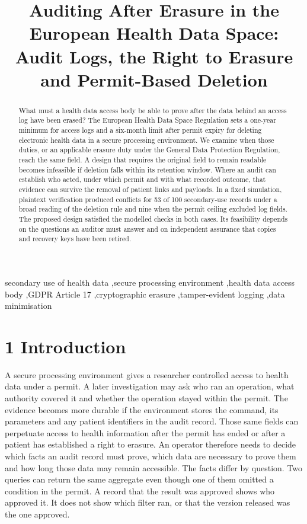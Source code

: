 \documentclass[preprint,review,12pt]{elsarticle}
\begin{document}
\begin{frontmatter}
\title{Auditing After Erasure in the European Health Data Space: Audit
Logs, the Right to Erasure and Permit-Based Deletion}
\begin{abstract}
What must a health data access body be able to prove after the data
behind an access log have been erased? The European Health Data Space
Regulation sets a one-year minimum for access logs and a six-month limit
after permit expiry for deleting electronic health data in a secure
processing environment. We examine when those duties, or an applicable
erasure duty under the General Data Protection Regulation, reach the
same field. A design that requires the original field to remain readable
becomes infeasible if deletion falls within its retention window. Where
an audit can establish who acted, under which permit and with what
recorded outcome, that evidence can survive the removal of patient links
and payloads. In a fixed simulation, plaintext verification produced
conflicts for 53 of 100 secondary-use records under a broad reading of
the deletion rule and nine when the permit ceiling excluded log fields.
The proposed design satisfied the modelled checks in both cases. Its
feasibility depends on the questions an auditor must answer and on
independent assurance that copies and recovery keys have been retired.
\end{abstract}
\begin{keyword}
secondary use of health data \sep secure processing
environment \sep health data access body \sep GDPR Article
17 \sep cryptographic erasure \sep tamper-evident logging \sep data
minimisation
\end{keyword}
\end{frontmatter}
\hypertarget{introduction}{%
\section{1 Introduction}\label{introduction}}

A secure processing environment gives a researcher controlled access to
health data under a permit. A later investigation may ask who ran an
operation, what authority covered it and whether the operation stayed
within the permit. The evidence becomes more durable if the environment
stores the command, its parameters and any patient identifiers in the
audit record. Those same fields can perpetuate access to health
information after the permit has ended or after a patient has
established a right to erasure. An operator therefore needs to decide
which facts an audit record must prove, which data are necessary to
prove them and how long those data may remain accessible. The facts
differ by question. Two queries can return the same aggregate even
though one of them omitted a condition in the permit. A record that the
result was approved shows who approved it. It does not show which filter
ran, or that the version released was the one approved.
\end{document}

